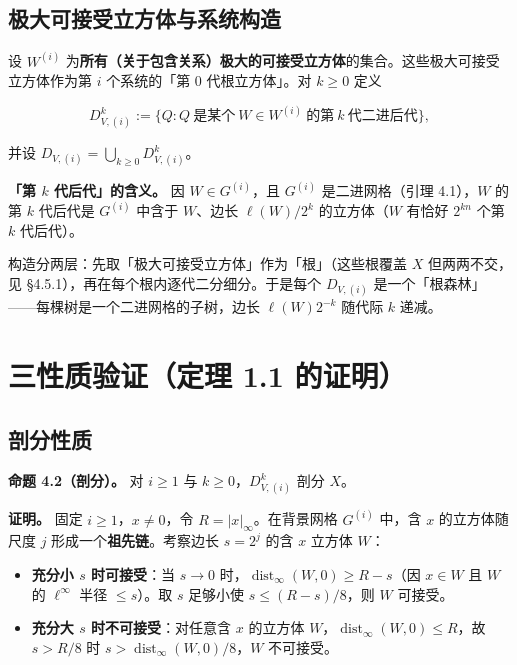 \documentclass[a4paper,11pt,openany]{ctexbook}
\numberwithin{equation}{chapter}
\numberwithin{figure}{chapter}
\numberwithin{table}{chapter}
\begin{document}
\subsection{极大可接受立方体与系统构造}

设 $W^{(i)}$ 为\textbf{所有（关于包含关系）极大的可接受立方体}的集合。这些极大可接受立方体作为第 $i$ 个系统的「第 $0$ 代根立方体」。对 $k\ge0$ 定义

$$D_{V,(i)}^k:=\{Q : Q\ \text{是某个}\ W\in W^{(i)}\ \text{的第}\ k\ \text{代二进后代}\},$$

并设 $D_{V,(i)}=\bigcup_{k\ge0}D_{V,(i)}^k$。

\textbf{「第 $k$ 代后代」的含义。} 因 $W\in G^{(i)}$，且 $G^{(i)}$ 是二进网格（引理 4.1），$W$ 的第 $k$ 代后代是 $G^{(i)}$ 中含于 $W$、边长 $\ell(W)/2^k$ 的立方体（$W$ 有恰好 $2^{kn}$ 个第 $k$ 代后代）。

\begin{intuitionbox}
构造分两层：先取「极大可接受立方体」作为「根」（这些根覆盖 $X$ 但两两不交，见 §4.5.1），再在每个根内逐代二分细分。于是每个 $D_{V,(i)}$ 是一个「根森林」——每棵树是一个二进网格的子树，边长 $\ell(W)2^{-k}$ 随代际 $k$ 递减。
\end{intuitionbox}

\section{三性质验证（定理 1.1 的证明）}

\subsection{剖分性质}

\textbf{命题 4.2（剖分）。} 对 $i\ge1$ 与 $k\ge0$，$D_{V,(i)}^k$ 剖分 $X$。

\textbf{证明。} 固定 $i\ge1$，$x\neq0$，令 $R=|x|_\infty$。在背景网格 $G^{(i)}$ 中，含 $x$ 的立方体随尺度 $j$ 形成一个\textbf{祖先链}。考察边长 $s=2^j$ 的含 $x$ 立方体 $W$：

\begin{itemize}
\item \textbf{充分小 $s$ 时可接受}：当 $s\to0$ 时，$\operatorname{dist}_\infty(W,0)\ge R-s$（因 $x\in W$ 且 $W$ 的 $\ell^\infty$ 半径 $\le s$）。取 $s$ 足够小使 $s\le(R-s)/8$，则 $W$ 可接受。
\item \textbf{充分大 $s$ 时不可接受}：对任意含 $x$ 的立方体 $W$，$\operatorname{dist}_\infty(W,0)\le R$，故 $s>R/8$ 时 $s>\operatorname{dist}_\infty(W,0)/8$，$W$ 不可接受。
\end{itemize}
\end{document}
